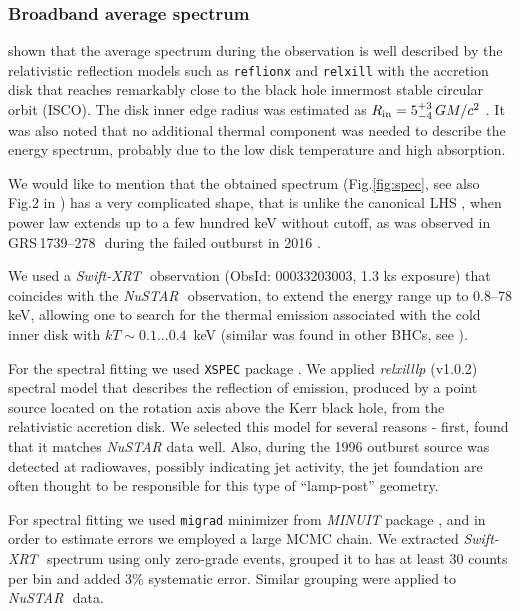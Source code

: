 \documentclass[a4paper,fleqn,usenatbib]{mnras}
\def\grs{{GRS\,1739--278\,}}
\def\swiftx{{\em Swift-XRT\,}}
\def\nustar{{\em NuSTAR\,}}
\begin{document}
\subsubsection{Broadband average spectrum}
\label{sec:spec}            

\citet{miller15_nust} shown that the average spectrum during the observation is well described by the relativistic reflection models such as \texttt{reflionx} \citep{ross05} and \texttt{relxill} \citep{garcia14, dauser14,dauser16} with the accretion disk that reaches remarkably close to the black hole innermost stable circular orbit (ISCO). 
The disk inner edge radius was estimated as $R_{\rm in} = 5^{+3}_{-4}\, G M/c^{2}$ \citep{miller15_nust}. 
It was also noted that no additional thermal component was needed to describe the energy spectrum, probably due to the low disk temperature and high absorption.

We would like to mention that the obtained spectrum (Fig.\ref{fig:spec}, see also Fig.2 in \citet{miller15_nust}) has a very complicated shape, that is unlike the canonical LHS \citep{zdziarski04}, when power law extends up to a few hundred keV without cutoff, as was observed in \grs\, during the failed outburst in 2016 \citep{mereminskiy17grs}.

We used a \swiftx\, observation (ObsId: 00033203003, 1.3 ks exposure) that coincides with the \nustar\, observation, to extend the energy range up to 0.8--78 keV, allowing one to search for the thermal emission associated with the cold inner disk with $kT \sim 0.1...0.4$~keV (similar was found in other BHCs, see \cite[][ etc]{miller06b,miller06a,parker15}).

For the spectral fitting we used \texttt{XSPEC} package \citep{arnaud96}.
We applied {\it relxilllp} (v1.0.2) spectral model that describes the reflection of emission, produced by a point source located on the rotation axis above the Kerr black hole, from the relativistic accretion disk. 
We selected this model for several reasons - first, \cite{miller15_nust} found that it matches {\it NuSTAR} data well. 
Also, during the 1996 outburst source was detected at radiowaves, possibly indicating jet activity, the jet foundation are often thought to be responsible for this type of ``lamp-post'' geometry. 

For spectral fitting we used \texttt{migrad} minimizer from {\em MINUIT} package \citep{james75minuit}, and in order to estimate errors we employed a large MCMC chain. 
We extracted \swiftx\, spectrum using only zero-grade events, grouped it to has at least 30 counts per bin and added 3\% systematic error. Similar grouping were applied to \nustar\, data. 
\end{document}
